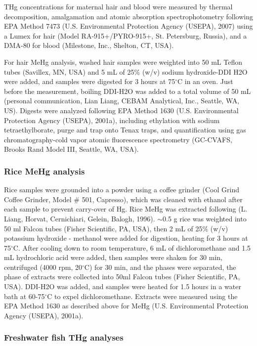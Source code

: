 THg concentrations for maternal hair and blood were measured by thermal decomposition, amalgamation and atomic absorption spectrophotometry following EPA Method 7473 (U.S. Environmental Protection Agency (USEPA), 2007) using a Lumex for hair (Model RA-915+/PYRO-915+, St. Petersburg, Russia), and a DMA-80 for blood (Milestone, Inc., Shelton, CT, USA).

For hair MeHg analysis, washed hair samples were weighted into 50 mL Teflon tubes (Savillex, MN, USA) and 5 mL of 25\% (w/v) sodium hydroxide-DDI H2O were added, and samples were digested for 3 hours at 75\({^\circ}\)C in an oven. Just before the measurement, boiling DDI-H2O was added to a total volume of 50 mL (personal communication, Lian Liang, CEBAM Analytical, Inc., Seattle, WA, US). Digests were analyzed following EPA Method 1630 (U.S. Environmental Protection Agency (USEPA), 2001a), including ethylation with sodium tetraethylborate, purge and trap onto Tenax traps, and quantification using gas chromatography-cold vapor atomic fluorescence spectrometry (GC-CVAFS, Brooks Rand Model III, Seattle, WA, USA). 

\subsubsection{Rice MeHg analysis}

Rice samples were grounded into a powder using a coffee grinder (Cool Grind Coffee Grinder, Model \# 501, Capresso), which was cleaned with ethanol after each sample to prevent carry-over of Hg. Rice MeHg was extracted following (L. Liang, Horvat, Cernichiari, Gelein,  Balogh, 1996). \({\sim}\)0.5 g rice was weighted into 50 ml Falcon tubes (Fisher Scientific, PA, USA), then 2 mL of 25\% (w/v) potassium hydroxide - methanol were added for digestion, heating for 3 hours at 75\({^\circ}\)C. After cooling down to room temperature, 6 mL of dichloromethane and 1.5 mL hydrochloric acid were added, then samples were shaken for 30 min, centrifuged  (4000 rpm, 20\({^\circ}\)C) for 30 min, and the phases were separated, the phase of extracts were collected into 50ml Falcon tubes (Fisher Scientific, PA, USA). DDI-H2O was added, and samples were heated for 1.5 hours in a water bath at 60-75\({^\circ}\)C to expel dichloromethane. Extracts were measured using the EPA Method 1630 as described above for MeHg (U.S. Environmental Protection Agency (USEPA), 2001a).

\subsubsection{Freshwater fish THg analyses}

